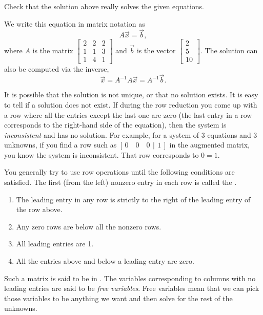 \documentclass{ximera}
\begin{document}
\begin{exercise}
    Check that the solution above really solves the given equations.
\end{exercise}

We write this equation in matrix notation as
\begin{equation*}
    A \vec{x} = \vec{b} ,
\end{equation*}
where $A$ is the matrix
$\left[ 
    \begin{smallmatrix}
        2 & 2 & 2 \\
        1 & 1 & 3 \\
        1 & 4 & 1 
    \end{smallmatrix} 
\right]$ 
and $\vec{b}$ is the vector
$\left[ 
    \begin{smallmatrix}
        2 \\
        5 \\
        10
    \end{smallmatrix} 
\right]$.  
The solution can also be computed via the inverse,
\begin{equation*}
    \vec{x} = A^{-1} A \vec{x} = A^{-1} \vec{b} .
\end{equation*}


It is
possible that the solution is not unique, or that no solution exists. It is easy to tell if a solution does not exist.  If during the row reduction you come up with a row where all the entries except the last one are zero (the last entry in a row corresponds to the right-hand side of the equation), then the system is \emph{inconsistent} and has no solution.  For example, for a system of 3 equations and 3 unknowns, if you find a row such as $[\,0 \quad 0 \quad 0 ~\,|\,~ 1\,]$ in the augmented matrix, you know the system is inconsistent.  That row corresponds to $0=1$.


You generally try to use row operations until the following conditions are satisfied.  The first (from the left) nonzero entry in each row is called the \emph{}.
\begin{enumerate}
    \item The leading entry in any row is strictly to the right of the leading entry of the row above.
    \item Any zero rows are below all the nonzero rows.
    \item All leading entries are 1.
    \item All the entries above and below a leading entry are zero.
\end{enumerate}
Such a matrix is said to be in \emph{}.  The variables corresponding to columns with no leading entries are said to be \emph{free variables}. Free variables mean that we can pick those variables to be anything we want and then solve for the rest of the unknowns.
\end{document}
